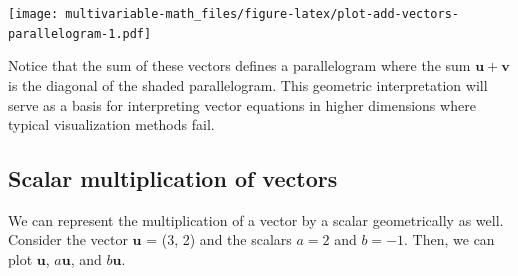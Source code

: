 \documentclass[
]{book}
\newenvironment{Shaded}{\begin{snugshade}}{\end{snugshade}}
\newcommand{\DataTypeTok}[1]{\textcolor[rgb]{0.13,0.29,0.53}{#1}}
\newcommand{\DecValTok}[1]{\textcolor[rgb]{0.00,0.00,0.81}{#1}}
\newcommand{\FloatTok}[1]{\textcolor[rgb]{0.00,0.00,0.81}{#1}}
\newcommand{\KeywordTok}[1]{\textcolor[rgb]{0.13,0.29,0.53}{\textbf{#1}}}
\newcommand{\NormalTok}[1]{#1}
\newcommand{\OperatorTok}[1]{\textcolor[rgb]{0.81,0.36,0.00}{\textbf{#1}}}
\newcommand{\StringTok}[1]{\textcolor[rgb]{0.31,0.60,0.02}{#1}}
\theoremstyle{definition}
\theoremstyle{definition}
\theoremstyle{definition}
\theoremstyle{definition}
\theoremstyle{remark}
\begin{document}
\texttt{[image: multivariable-math\_files/figure-latex/plot-add-vectors-parallelogram-1.pdf]}

Notice that the sum of these vectors defines a parallelogram where the sum \(\mathbf{u} + \mathbf{v}\) is the diagonal of the shaded parallelogram. This geometric interpretation will serve as a basis for interpreting vector equations in higher dimensions where typical visualization methods fail.

\hypertarget{scalar-multiplication-of-vectors}{%
\subsection{Scalar multiplication of vectors}\label{scalar-multiplication-of-vectors}}

We can represent the multiplication of a vector by a scalar geometrically as well. Consider the vector \(\mathbf{u}\) = (3, 2) and the scalars \(a = 2\) and \(b = -1\). Then, we can plot \(\mathbf{u}\), \(a\mathbf{u}\), and \(b\mathbf{u}\).

\begin{Shaded}
\end{Shaded}
\end{document}
